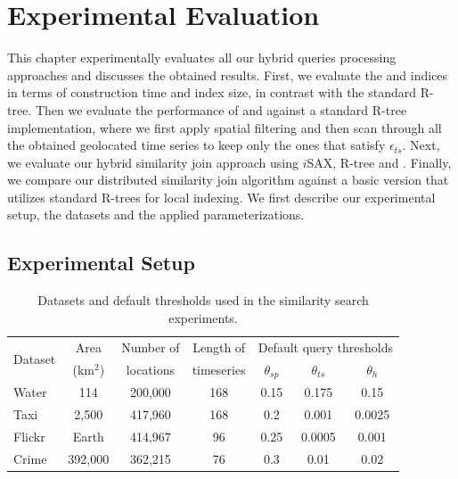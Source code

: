 
\graphicspath{{Papers/SIGSpatial2017/}{Papers/SIGSpatial2018/}}

\section{Experimental Evaluation} 
\label{sec:exp_btsr}

This chapter experimentally evaluates all our hybrid queries processing approaches and discusses the obtained results. First, we evaluate the \tsr and \btsr indices in terms of construction time and index size, in contrast with the standard R-tree. Then we evaluate the performance of \tsr and \btsr against a standard R-tree implementation, where we first apply spatial filtering and then scan through all the obtained geolocated time series to keep only the ones that satisfy $\epsilon_{ts}$. Next, we evaluate our hybrid similarity join approach using $i$SAX, R-tree and \btsr. Finally, we compare our distributed similarity join algorithm against a basic version that utilizes standard R-trees for local indexing. We first describe our experimental setup, the datasets and the applied parameterizations.

\subsection{Experimental Setup}
\label{subsec:evaluation_setup}

\begin{table}[!ht]
	\centering
	\caption{Datasets and default thresholds used in the similarity search experiments.}
	\centering
	\begin{small}
	\begin{tabular}{lcccccc}
	\hline
	\multirow{2}{*}{Dataset} & Area & Number of & Length of & \multicolumn{3}{c}{Default query thresholds} \\
	 & (km$^2$) & locations & timeseries & $\theta_{sp}$ & $\theta_{ts}$ & $\theta_h$ \\
	\hline
	Water & 114 & 200,000 & 168 &  0.15 & 0.175 & 0.15  \\
	Taxi & 2,500 & 417,960 & 168 & 0.2 & 0.001 & 0.0025 \\
	Flickr & Earth & 414,967 & 96 & 0.25 & 0.0005 & 0.001 \\
    Crime & 392,000 & 362,215 & 76 & 0.3 & 0.01 & 0.02 \\
	\hline
	\end{tabular}
	\end{small}
	\label{tab:datasets_btsr}
\end{table}

